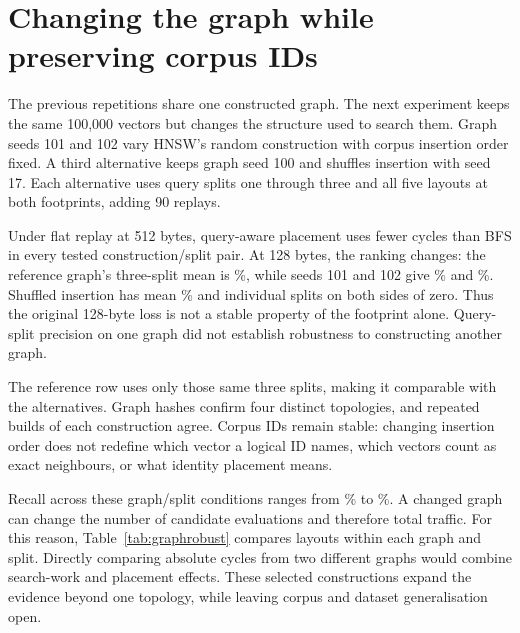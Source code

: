 \section{Changing the graph while preserving corpus IDs}
The previous repetitions share one constructed graph. The next experiment keeps the same 100,000 vectors but changes the structure used to search them. Graph seeds 101 and 102 vary HNSW's random construction with corpus insertion order fixed. A third alternative keeps graph seed 100 and shuffles insertion with seed 17. Each alternative uses query splits one through three and all five layouts at both footprints, adding 90 replays.

\begin{table}[htbp]\centering\small
\caption[Graph-construction robustness]{Query-aware/BFS cycle differences for four constructions on the same three query splits. The mean and minimum/maximum describe these observations; the range is not a confidence interval over possible graphs.}\label{tab:graphrobust}

\end{table}

Under flat replay at 512 bytes, query-aware placement uses fewer cycles than BFS in every tested construction/split pair. At 128 bytes, the ranking changes: the reference graph's three-split mean is \GraphRefCompact\%, while seeds 101 and 102 give \GraphOneCompact\% and \GraphTwoCompact\%. Shuffled insertion has mean \GraphShuffleCompact\% and individual splits on both sides of zero. Thus the original 128-byte loss is not a stable property of the footprint alone. Query-split precision on one graph did not establish robustness to constructing another graph.

The reference row uses only those same three splits, making it comparable with the alternatives. Graph hashes confirm four distinct topologies, and repeated builds of each construction agree. Corpus IDs remain stable: changing insertion order does not redefine which vector a logical ID names, which vectors count as exact neighbours, or what identity placement means.

Recall across these graph/split conditions ranges from \GraphRecallMin\% to \GraphRecallMax\%. A changed graph can change the number of candidate evaluations and therefore total traffic. For this reason, Table~\ref{tab:graphrobust} compares layouts within each graph and split. Directly comparing absolute cycles from two different graphs would combine search-work and placement effects. These selected constructions expand the evidence beyond one topology, while leaving corpus and dataset generalisation open.

